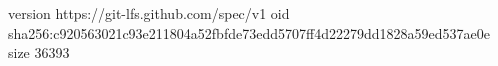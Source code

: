 version https://git-lfs.github.com/spec/v1
oid sha256:c920563021c93e211804a52fbfde73edd5707ff4d22279dd1828a59ed537ae0e
size 36393
